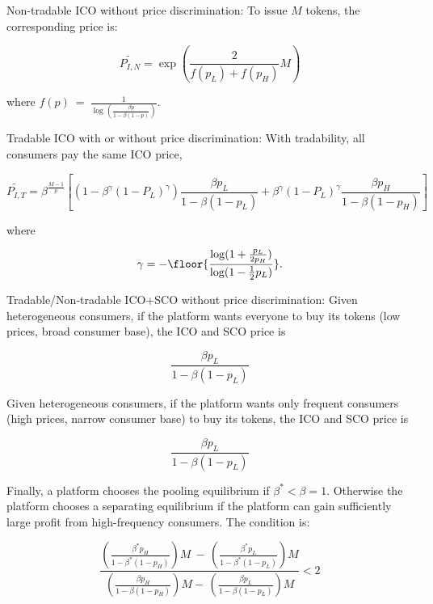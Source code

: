 Non-tradable ICO without price discrimination: To issue $M$ tokens, the corresponding price is:

\begin{equation}
    \widetilde{P_{I,N}}=\exp{\left(\frac{2}{f(p_{L})+f(p_{H})} M\right)}
\end{equation}

where $f(p)\ =\ \frac{1}{\log\left(\frac{\beta p}{1-\beta(1-p)}\right)}$.

Tradable ICO with or without price discrimination: With tradability, all consumers pay the same ICO price,

\begin{equation}
    \widetilde{P_{I,T}}=\beta^{\frac{M-1}{p}}\left[(1-\beta^{\gamma}(1-P_{L})^{\gamma})\frac{\beta p_{L}}{1-\beta(1-p_{L})}+\beta^{\gamma}(1-P_{L})^{\gamma}\frac{\beta p_{H}}{1-\beta(1-p_{H})}\right]
\end{equation}

where

\begin{equation}
    \gamma=-\floor{\frac{\log(1+\frac{p_{L}}{2p_{H}})}{\log(1-\frac{1}{2}p_{L})}}.
\end{equation}

Tradable/Non-tradable ICO+SCO without price discrimination: Given heterogeneous consumers, if the platform wants everyone to buy its tokens (low prices, broad consumer base), the ICO and SCO price is 

\begin{equation}
    \frac{\beta p_{L}}{1-\beta(1-p_{L})}
\end{equation}

Given heterogeneous consumers, if the platform wants only frequent consumers (high prices, narrow consumer base) to buy its tokens, the ICO and SCO price is 

\begin{equation}
    \frac{\beta p_{L}}{1-\beta(1-p_{L})}
\end{equation}

Finally, a platform chooses the pooling equilibrium if $\beta^{*} < \beta = 1$. Otherwise the platform chooses a separating equilibrium if the platform can gain sufficiently large profit from high-frequency consumers. The condition is:

\begin{equation}
    \frac{\left(\frac{\beta^{*}p_{H}}{1\!-\!\beta^{*}(1\!-\!p_{H})}\right){M}\ -\,\left(\frac{\beta^{*}p_{L}}{1\!-\!\beta^{*}(1\!-\!p_{L})}\right){M}}
    {\left(\frac{\beta p_{H}}{1-\beta(1\!-\!p_{H})}\right)M-\,\left(\frac{\beta p_{L}}{1\!-\!\beta(1\!-\!p_{L})}\right)M}
    < 2
\end{equation}


